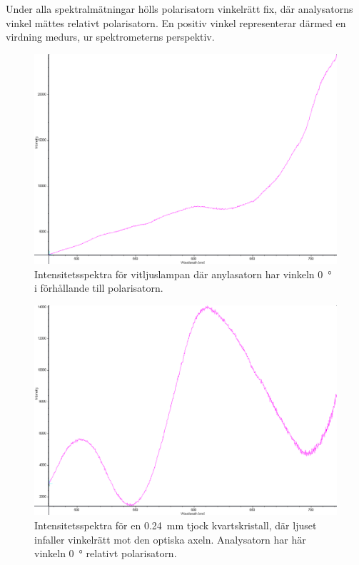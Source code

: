 \documentclass[a4paper]{article}
\begin{document}

Under alla spektralmätningar hölls polarisatorn vinkelrätt fix, där analysatorns vinkel mättes relativt polarisatorn. En positiv vinkel representerar därmed en virdning medurs, ur spektrometerns perspektiv.

\FloatBarrier
\begin{figure}[ht!]
	\centering
	\includegraphics[width=\linewidth]{data/spektra_fritt_inv}
	\caption{Intensitetsspektra för vitljuslampan där anylasatorn har vinkeln \SI{0}{\degree} i förhållande till polarisatorn.}
	\label{fig:}
\end{figure}
\FloatBarrier

\FloatBarrier
\begin{figure}[ht!]
	\centering
	\includegraphics[width=\linewidth]{data/spektra_180_kristall1_180_inv}
	\caption{Intensitetsspektra för en \SI{0.24}{\milli\m} tjock kvartskristall, där ljuset infaller vinkelrätt mot den optiska axeln. Analysatorn har här vinkeln \SI{0}{\degree} relativt polarisatorn.}
	\label{fig:}
\end{figure}
\FloatBarrier
\end{document}
